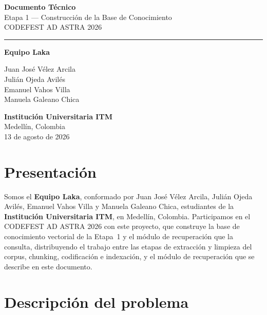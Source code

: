 \documentclass[11pt]{article}
\begin{document}
\begin{titlepage}
\thispagestyle{empty}
\begin{center}

\vspace*{2.5cm}

{\Huge\bfseries\color{azulcf} Documento Técnico}\\[0.4em]
{\Large Etapa 1 --- Construcción de la Base de Conocimiento}\\[1.2em]
{\Large\color{rojocf} CODEFEST AD ASTRA 2026}

\vspace{1.8cm}
\hrule
\vspace{1.8cm}

{\LARGE\bfseries Equipo Laka}

\vspace{1.2em}

{\large
Juan José Vélez Arcila\\[0.3em]
Julián Ojeda Avilés\\[0.3em]
Emanuel Vahos Villa\\[0.3em]
Manuela Galeano Chica
}

\vfill

{\large\bfseries Institución Universitaria ITM}\\[0.5em]
{\large Medellín, Colombia}\\[0.3em]
{\large 13 de agosto de 2026}

\vspace{1.5cm}

\end{center}
\end{titlepage}

\section{Presentación}

Somos el \textbf{Equipo Laka}, conformado por Juan José Vélez Arcila, Julián
Ojeda Avilés, Emanuel Vahos Villa y Manuela Galeano Chica, estudiantes de la
\textbf{Institución Universitaria ITM}, en Medellín, Colombia. Participamos
en el CODEFEST AD ASTRA 2026
con este proyecto, que construye la base de conocimiento vectorial de la
Etapa~1 y el módulo de recuperación que la consulta, distribuyendo el trabajo
entre las etapas de extracción y limpieza del corpus, chunking, codificación
e indexación, y el módulo de recuperación que se describe en este documento.

\section{Descripción del problema}
\end{document}
